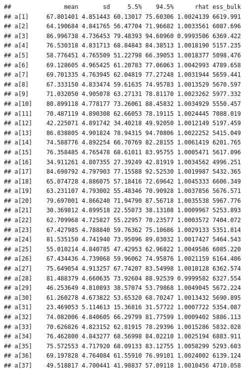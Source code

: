 \documentclass[
]{article}
\begin{document}
\begin{verbatim}
##               mean       sd     5.5%    94.5%      rhat ess_bulk
## a[1]     67.801401 4.851443 60.13017 75.60306 1.0024139 6619.991
## a[2]     64.190684 4.841765 56.47704 71.96682 1.0033561 6087.696
## a[3]     86.996738 4.736453 79.48393 94.60960 0.9993506 6369.422
## a[4]     76.530318 4.831713 68.84843 84.38513 1.0018190 5157.235
## a[5]     58.776451 4.765509 51.22798 66.39053 1.0018377 5098.476
## a[6]     69.128605 4.965425 61.20783 77.06063 1.0042993 4789.658
## a[7]     69.701335 4.763945 62.04819 77.27248 1.0031944 5659.441
## a[8]     67.333150 4.833474 59.61635 74.95783 1.0013529 5670.597
## a[9]     71.032050 4.905078 63.27131 78.81170 1.0023262 5977.332
## a[10]    80.899118 4.778177 73.26061 88.45832 1.0034929 5550.457
## a[11]    70.487119 4.890308 62.66053 78.19115 1.0024445 7088.019
## a[12]    42.225071 4.891742 34.40218 49.92050 1.0012149 5197.459
## a[13]    86.838805 4.901824 78.94315 94.70806 1.0022252 5415.049
## a[14]    74.588776 4.892254 66.70769 82.28155 1.0061419 6201.765
## a[15]    76.358485 4.765478 68.61011 83.95755 1.0005471 5617.096
## a[16]    34.911261 4.807355 27.39249 42.81919 1.0034562 4996.251
## a[17]    84.690792 4.797903 77.15588 92.52530 1.0019987 5432.365
## a[18]    65.074728 4.886075 57.18416 72.69642 1.0045333 6606.349
## a[19]    63.231107 4.793002 55.48346 70.90928 1.0037856 5676.571
## a[20]    79.697001 4.866240 71.94790 87.56718 1.0035538 5967.776
## a[21]    30.369812 4.899518 22.55073 38.13108 1.0009967 5253.893
## a[22]    62.709968 4.725827 55.22957 70.23577 1.0003572 7404.072
## a[23]    67.427985 4.788840 59.76362 75.10686 1.0029133 5351.814
## a[24]    81.535150 4.741940 73.95096 89.03032 1.0017427 5464.543
## a[25]    55.010214 4.840785 47.42953 62.96822 1.0049586 6085.220
## a[26]    67.434436 4.739068 59.96062 74.95876 1.0021159 6164.406
## a[27]    75.649054 4.913257 67.74207 83.54998 1.0010128 6362.574
## a[28]    81.488379 4.660635 73.92604 88.92539 0.9999582 6327.554
## a[29]    46.253649 4.810893 38.57074 53.79868 1.0049045 5672.224
## a[30]    61.260278 4.673822 53.65320 68.70247 1.0013432 5690.895
## a[31]    23.469053 5.114613 15.36816 31.57722 1.0007722 5354.087
## a[32]    74.082006 4.840605 66.29799 81.77599 1.0009402 5886.113
## a[33]    70.626826 4.823152 62.81915 78.29396 1.0015286 5832.028
## a[34]    76.462800 4.843277 68.56998 84.02210 1.0025194 6883.911
## a[35]    75.572553 4.717920 68.09133 83.12755 1.0058299 5293.603
## a[36]    69.197828 4.764084 61.55910 76.99101 1.0024002 6139.124
## a[37]    49.518817 4.700441 41.98837 57.09118 1.0010456 4710.058

\end{verbatim}
\end{document}
